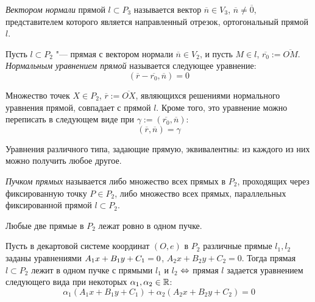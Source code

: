     \begin{definition}
    	\textit{Вектором нормали} прямой $l \subset P_3$ называется вектор $\overline{n} \in V_3$, $\overline{n} \ne \overline 0$, представителем которого является направленный отрезок, ортогональный прямой $l$.
    \end{definition}
    
    \begin{definition}
    	Пусть $l \subset P_2$ "--- прямая с вектором нормали $\overline{n} \in V_2$, и пусть $M \in l$, $\overline{r_0} := \overline{OM}$. \textit{Нормальным уравнением прямой} называется следующее уравнение:
    	\[(\overline{r} - \overline{r_0}, \overline{n}) = 0\]
    \end{definition}
    
    \begin{note}
    	Множество точек $X \in P_2$, $\overline{r} := \overline{OX}$, являющихся решениями нормального уравнения прямой, совпадает с прямой $l$. Кроме того, это уравнение можно переписать в следующем виде при $\gamma := (\overline{r_0}, \overline{n})$:
    	\[(\overline{r}, \overline{n}) = \gamma\]
    \end{note}
    
    \begin{note}
    	Уравнения различного типа, задающие прямую, эквивалентны: из каждого из них можно получить любое другое.
    \end{note}
    
    \begin{definition}
    	\textit{Пучком прямых} называется либо множество всех прямых в $P_2$, проходящих через фиксированную точку $P \in P_2$, либо множество всех прямых, параллельных фиксированной прямой $l \subset P_2$.
    \end{definition}
    
    \begin{note}
    	Любые две прямые в $P_2$ лежат ровно в одном пучке.
    \end{note}
    
    \begin{theorem}
    	Пусть в декартовой системе координат $(O, e)$ в $P_2$ различные прямые $l_1, l_2$ заданы уравнениями $A_1x\hm{+}B_1y+C_1=0$, $A_2x+B_2y+C_2=0$. Тогда прямая $l \subset P_2$ лежит в одном пучке с прямыми $l_1$ и $l_2$ $\Leftrightarrow$ прямая $l$ задается уравнением следующего вида при некоторых $\alpha_1, \alpha_2 \in \mathbb{R}$:
    	\[\alpha_1(A_1x+B_1y+C_1) + \alpha_2(A_2x+B_2y+C_2) = 0\]
    \end{theorem}
    
